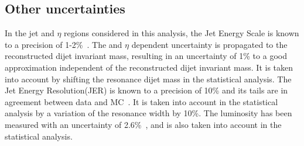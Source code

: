 \subsection{Other uncertainties}

In the jet \PT and $\eta$ regions considered in this analysis, the Jet Energy Scale is known to a precision of 1-2\%~\cite{JME-JINST,Collaboration:2013dp}.
The \PT and $\eta$ dependent uncertainty is propagated to the reconstructed dijet invariant mass, resulting in an uncertainty of 1\% to a good approximation independent of the reconstructed dijet invariant mass.
It is taken into account by shifting the resonance dijet mass in the statistical analysis.
The Jet Energy Resolution(JER) is known to a precision of 10\% and its tails are in agreement between data and MC~\cite{JME-JINST}.
It is taken into account in the statistical analysis by a variation of the resonance width by 10\%.
The luminosity has been measured with an uncertainty of 2.6\%~\cite{LUM-13-001}, and is also taken into account in the statistical analysis.

\clearpage
